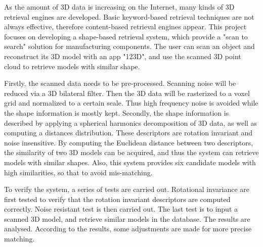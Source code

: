 As the amount of 3D data is increasing on the Internet, many kinds of 3D retrieval engines are developed. Basic keyword-based retrieval techniques are not always effective, therefore content-based retrieval engines appear. This project focuses on developing a shape-based retrieval system, which provide a "scan to search" solution for manufacturing components. The user can scan an object and reconstruct its 3D model with an app "123D", and use the scanned 3D point cloud to retrieve models with similar shape. 

Firstly, the scanned data needs to be pre-processed. Scanning noise will be reduced via a 3D bilateral filter. Then the 3D data will be rasterized to a voxel grid and normalized to a certain scale. Thus high frequency noise is avoided while the shape information is mostly kept. Secondly, the shape information is described by applying a spherical harmonics decomposition of 3D data, as well as computing a distances distribution. These descriptors are rotation invariant and noise insensitive. By computing the Euclidean distance between two descriptors, the similarity of two 3D models can be acquired, and thus the system can retrieve models with similar shapes. Also, this system provides six candidate models with high similarities, so that to avoid mis-matching. 

To verify the system, a series of tests are carried out. Rotational invariance are first tested to verify that the rotation invariant descriptors are computed correctly. Noise resistant test is then carried out. The last test is to input a scanned 3D model, and retrieve similar models in the database. The results are analysed. According to the results, some adjustments are made for more precise matching. 